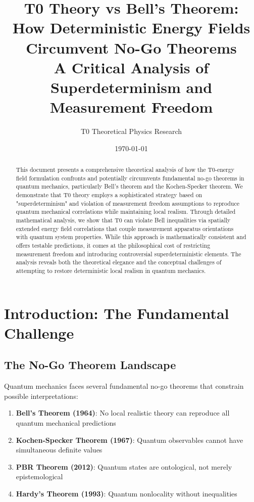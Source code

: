 \documentclass[12pt,a4paper]{article}
\title{T0 Theory vs Bell's Theorem: \\
	How Deterministic Energy Fields Circumvent No-Go Theorems \\
	\large A Critical Analysis of Superdeterminism and Measurement Freedom}
\author{T0 Theoretical Physics Research}
\date{\today}
\begin{document}
	
	\maketitle
	
	\begin{abstract}
		This document presents a comprehensive theoretical analysis of how the T0-energy field formulation confronts and potentially circumvents fundamental no-go theorems in quantum mechanics, particularly Bell's theorem and the Kochen-Specker theorem. We demonstrate that T0 theory employs a sophisticated strategy based on "superdeterminism" and violation of measurement freedom assumptions to reproduce quantum mechanical correlations while maintaining local realism. Through detailed mathematical analysis, we show that T0 can violate Bell inequalities via spatially extended energy field correlations that couple measurement apparatus orientations with quantum system properties. While this approach is mathematically consistent and offers testable predictions, it comes at the philosophical cost of restricting measurement freedom and introducing controversial superdeterministic elements. The analysis reveals both the theoretical elegance and the conceptual challenges of attempting to restore deterministic local realism in quantum mechanics.
	\end{abstract}
	
	\tableofcontents
	\newpage
	
	\section{Introduction: The Fundamental Challenge}
	
	\subsection{The No-Go Theorem Landscape}
	
	Quantum mechanics faces several fundamental no-go theorems that constrain possible interpretations:
	
	\begin{enumerate}
		\item \textbf{Bell's Theorem (1964)}: No local realistic theory can reproduce all quantum mechanical predictions
		\item \textbf{Kochen-Specker Theorem (1967)}: Quantum observables cannot have simultaneous definite values
		\item \textbf{PBR Theorem (2012)}: Quantum states are ontological, not merely epistemological
		\item \textbf{Hardy's Theorem (1993)}: Quantum nonlocality without inequalities
	\end{enumerate}
	
\end{document}
